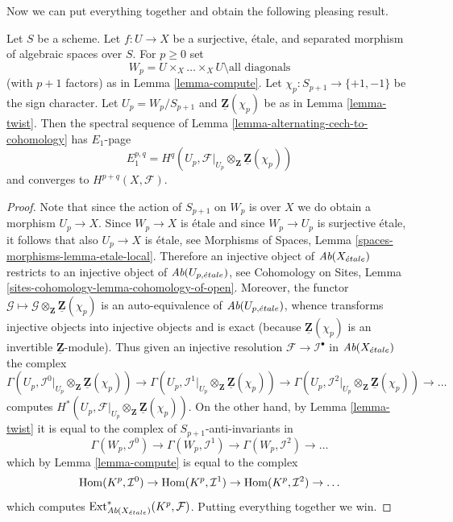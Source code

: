 \noindent
Now we can put everything together and obtain the following
pleasing result.

\begin{lemma}
\label{lemma-alternating-spectral-sequence}
Let $S$ be a scheme. Let $f : U \to X$ be a surjective, \'etale, and
separated morphism of algebraic spaces over $S$. For $p \geq 0$ set
$$
W_p = U \times_X \ldots \times_X U \setminus \text{all diagonals}
$$
(with $p + 1$ factors) as in Lemma \ref{lemma-compute}.
Let $\chi_p : S_{p + 1} \to \{+1, -1\}$ be the sign character.
Let $U_p = W_p/S_{p + 1}$ and $\underline{\mathbf{Z}}(\chi_p)$ be as in
Lemma \ref{lemma-twist}.
Then the spectral sequence of
Lemma \ref{lemma-alternating-cech-to-cohomology}
has $E_1$-page
$$
E_1^{p, q} =
H^q(U_p, \mathcal{F}|_{U_p} \otimes_\mathbf{Z} \underline{\mathbf{Z}}(\chi_p))
$$
and converges to $H^{p + q}(X, \mathcal{F})$.
\end{lemma}

\begin{proof}
Note that since the action of $S_{p + 1}$ on $W_p$ is over $X$ we do
obtain a morphism $U_p \to X$. Since $W_p \to X$ is \'etale and since
$W_p \to U_p$ is surjective \'etale, it follows
that also $U_p \to X$ is \'etale, see
Morphisms of Spaces, Lemma \ref{spaces-morphisms-lemma-etale-local}.
Therefore an injective object of
$\textit{Ab}(X_{\acute{e}tale})$ restricts to an injective object of
$\textit{Ab}(U_{p, {\acute{e}tale}})$, see
Cohomology on Sites, Lemma \ref{sites-cohomology-lemma-cohomology-of-open}.
Moreover, the functor
$\mathcal{G} \mapsto
\mathcal{G} \otimes_\mathbf{Z} \underline{\mathbf{Z}}(\chi_p)$
is an auto-equivalence of $\textit{Ab}(U_{p, {\acute{e}tale}})$, whence transforms injective
objects into injective objects and is exact (because
$\underline{\mathbf{Z}}(\chi_p)$ is an invertible
$\underline{\mathbf{Z}}$-module). Thus given an injective resolution
$\mathcal{F} \to \mathcal{I}^\bullet$ in $\textit{Ab}(X_{\acute{e}tale})$
the complex
$$
\Gamma(U_p,
\mathcal{I}^0|_{U_p} \otimes_\mathbf{Z} \underline{\mathbf{Z}}(\chi_p))
\to
\Gamma(U_p,
\mathcal{I}^1|_{U_p} \otimes_\mathbf{Z} \underline{\mathbf{Z}}(\chi_p))
\to
\Gamma(U_p,
\mathcal{I}^2|_{U_p} \otimes_\mathbf{Z} \underline{\mathbf{Z}}(\chi_p))
\to \ldots
$$
computes
$H^*(U_p,
\mathcal{F}|_{U_p} \otimes_\mathbf{Z} \underline{\mathbf{Z}}(\chi_p))$.
On the other hand, by
Lemma \ref{lemma-twist}
it is equal to the complex of $S_{p + 1}$-anti-invariants in
$$
\Gamma(W_p, \mathcal{I}^0) \to
\Gamma(W_p, \mathcal{I}^1) \to
\Gamma(W_p, \mathcal{I}^2) \to \ldots
$$
which by
Lemma \ref{lemma-compute}
is equal to the complex
$$
\mathop{\mathrm{Hom}}\nolimits(K^p, \mathcal{I}^0) \to
\mathop{\mathrm{Hom}}\nolimits(K^p, \mathcal{I}^1) \to
\mathop{\mathrm{Hom}}\nolimits(K^p, \mathcal{I}^2) \to \ldots
$$
which computes
$\mathop{\mathrm{Ext}}\nolimits^*_{\textit{Ab}(X_{\acute{e}tale})}(K^p, \mathcal{F})$.
Putting everything together we win.
\end{proof}





